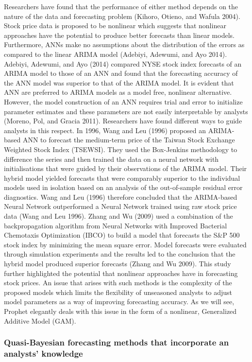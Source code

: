 \documentclass[12pt,a4paper]{article}
\numberwithin{equation}{section}
\numberwithin{figure}{section}
\numberwithin{table}{section}
\begin{document}
Researchers have found that the performance of either method depends on
the nature of the data and forecasting problem (Kihoro, Otieno, and
Wafula 2004). Stock price data is proposed to be nonlinear which
suggests that nonlinear approaches have the potential to produce better
forecasts than linear models. Furthermore, ANNs make no assumptions
about the distribution of the errors as compared to the linear ARIMA
model (Adebiyi, Adewumi, and Ayo 2014). Adebiyi, Adewumi, and Ayo (2014)
compared NYSE stock index forecasts of an ARIMA model to those of an ANN
and found that the forecasting accuracy of the ANN model was superior to
that of the ARIMA model. It is evident that ANN are preferred to ARIMA
models as a model free, nonlinear alternative. However, the model
construction of an ANN requires trial and error to initialize parameter
estimates and these parameters are not easily interpretable by analysts
(Moreno, Pol, and Gracia 2011). Researchers have found different ways to
guide analysts in this respect. In 1996, Wang and Leu (1996) proposed an
ARIMA-based ANN to forecast the medium-term price of the Taiwan Stock
Exchange Weighted Stock Index (TSEWSI). They used the Box-Jenkins
methodology to difference the series and then trained the data on a
neural network with initialisations that were guided by their
observations of the ARIMA model. Their hybrid model yielded forecasts
that were comparably superior to the individual models used in isolation
based on an analysis of the out-of-sample residual error diagnostics.
Wang and Leu (1996) therefore concluded that the ARIMA-based Neural
Network outperformed a Neural Network trained using raw stock price data
(Wang and Leu 1996). Zhang and Wu (2009) used a combination of the
backpropagation algorithm from Neural Networks with Improved Bacterial
Chemotaxis Optimization (IBCO) to build a model that forecasts the S\&P
500 stock index by minimizing the mean square error. Model forecasts
were evaluated through simulation experiments and the results led to the
conclusion that the hybrid model produced superior forecasts (Zhang and
Wu 2009). This study further highlighted the potential that nonlinear
approaches have in forecasting stock prices. An issue that arises with
such methods is the complexity of the proposed models which limits the
flexibility of unseasoned analysts to adjust model parameters as a way
of improving forecasting accuracy. As we will see, Prophet elegantly
deals with this issue in the form of a nonlinear, Generalized Additive
Model (GAM).

\subsubsection{Quasi-Bayesian forecasting methods that incorporate an
analysts'
knowledge}\label{quasi-bayesian-forecasting-methods-that-incorporate-an-analysts-knowledge}
\end{document}
